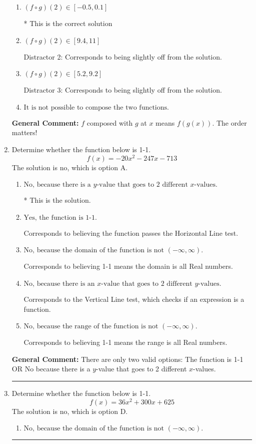 \documentclass{extbook}[14pt]
\newcommand{\litem}[1]{\item #1

\rule{\textwidth}{0.4pt}}
\begin{document}
\begin{enumerate}
{\begin{enumerate}[label=\Alph*.]
 Distractor 1: Corresponds to reversing the composition.
\item \( (f \circ g)(2) \in [-0.5, 0.1] \)

* This is the correct solution
\item \( (f \circ g)(2) \in [9.4, 11] \)

 Distractor 2: Corresponds to being slightly off from the solution.
\item \( (f \circ g)(2) \in [5.2, 9.2] \)

 Distractor 3: Corresponds to being slightly off from the solution.
\item \( \text{It is not possible to compose the two functions.} \)


\end{enumerate}

\textbf{General Comment:} $f$ composed with $g$ at $x$ means $f(g(x))$. The order matters!
}
\litem{
Determine whether the function below is 1-1.
\[ f(x) = -20 x^2 - 247 x - 713 \]The solution is \( \text{no} \), which is option A.\begin{enumerate}[label=\Alph*.]
\item \( \text{No, because there is a $y$-value that goes to 2 different $x$-values.} \)

* This is the solution.
\item \( \text{Yes, the function is 1-1.} \)

Corresponds to believing the function passes the Horizontal Line test.
\item \( \text{No, because the domain of the function is not $(-\infty, \infty)$.} \)

Corresponds to believing 1-1 means the domain is all Real numbers.
\item \( \text{No, because there is an $x$-value that goes to 2 different $y$-values.} \)

Corresponds to the Vertical Line test, which checks if an expression is a function.
\item \( \text{No, because the range of the function is not $(-\infty, \infty)$.} \)

Corresponds to believing 1-1 means the range is all Real numbers.
\end{enumerate}

\textbf{General Comment:} There are only two valid options: The function is 1-1 OR No because there is a $y$-value that goes to 2 different $x$-values.
}
\litem{
Determine whether the function below is 1-1.
\[ f(x) = 36 x^2 + 300 x + 625 \]The solution is \( \text{no} \), which is option D.\begin{enumerate}[label=\Alph*.]
\item \( \text{No, because the domain of the function is not $(-\infty, \infty)$.} \)


\end{enumerate}}
\end{enumerate}
\end{document}
